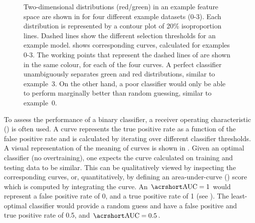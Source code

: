 \begin{figure}[htbp!]
    \centering
    \caption{\label{fig:rocs_examples}
    Two-dimensional distributions (red/green) in an example feature space are shown in  for four different example datasets (0-3).
    Each distribution is represented by a contour plot of 20\% isoproportion lines.
    Dashed lines show the different selection thresholds for an example \MVA model.
     shows corresponding \ROC curves, calculated for examples 0-3.
    The working points that represent the dashed lines of  are shown in the same colour, for each of the four curves.
    A perfect classifier unambiguously separates green and red distributions, similar to example~3.
    On the other hand, a poor classifier would only be able to perform marginally better than random guessing, similar to example~0.    
    }
\end{figure}


To assess the performance of a binary classifier, a receiver operating characteristic (\ROC) is often used.
A \ROC curve represents the true positive rate as a function of the false positive rate and is calculated by iterating over different \MVA classifier thresholds.
A visual representation of the meaning of \ROC curves is shown in .
Given an optimal classifier (no overtraining), one expects the \ROC curve calculated on training and testing data to be similar.
This can be qualitatively viewed by inspecting the corresponding curves, or, quantitatively, by defining an area-under-curve (\AUC) score which is computed by integrating the \ROC curve.
An $\mathrm{\AUC}=1$ would represent a false positive rate of 0, and a true positive rate of 1 (see ).
The least-optimal classifier would provide a random guess and have a false positive and true positive rate of 0.5, and $\mathrm{\AUC}=0.5$.

